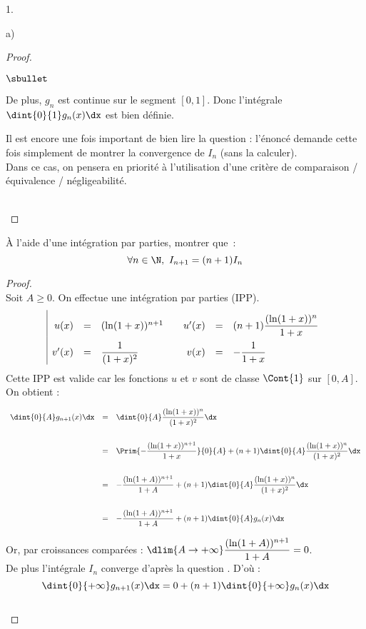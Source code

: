 \documentclass[11pt]{article}%
\begin{document}
\begin{noliste}{1.}
\begin{noliste}{a)}
\begin{proof}
\begin{noliste}{$\sbullet$}
  \item De plus, $g_n$ est continue sur le segment $[0,1]$. Donc 
  l'intégrale $\dint{0}{1} g_n(x) \dx$ est bien définie.
 \end{noliste}
 \begin{remark}
  Il est encore une fois important de bien lire la question : 
  l'énoncé demande cette fois simplement de montrer la 
  convergence de $I_n$ (sans la calculer).\\
  Dans ce cas, on pensera en priorité à l'utilisation 
  d'une critère de comparaison / équivalence / négligeabilité.
 \end{remark}~\\[-1.4cm]
\end{proof}


\item À l'aide d'une intégration par parties, montrer que~:
\[ 
\forall n \in \N, \ I_{n+1} = (n+1) I_n 
\]

\begin{proof}~\\
  Soit $A\geq 0$. On effectue une intégration par parties (IPP).
  \[
  \renewcommand{\arraystretch}{2.2}
  \begin{array}{|rcl@{\qquad}rcl}
   u(x) & = & (\ln(1+x))^{n+1} & u'(x) & = & (n+1) 
   \dfrac{(\ln(1+x))^n}{1+x} \\
   v'(x) & = & \dfrac{1}{(1+x)^2} & v(x) & = & -\dfrac{1}{1+x}
  \end{array}
  \]
Cette IPP est valide car les fonctions $u$ et $v$ sont de classe 
$\Cont{1}$ sur $[0,A]$. On obtient :
\[
 \begin{array}{rcl}
  \dint{0}{A} g_{n+1}(x) \dx & = & \dint{0}{A} \dfrac{(\ln(1+x))^n}
  {(1+x)^2} \dx 
  \\[.6cm]
  & = & \Prim{-\dfrac{(\ln(1+x))^{n+1}}{1+x}}{0}{A} + (n+1)
   \dint{0}{A}\dfrac{(\ln(1+x))^n}{(1+x)^2} \dx
   \\[.6cm]
   & = & -\dfrac{(\ln(1+A))^{n+1}}{1+A} + (n+1) \dint{0}{A} 
   \dfrac{(\ln(1+x))^n}{(1+x)^2} \dx
   \\[.6cm]
   & = & -\dfrac{(\ln(1+A))^{n+1}}{1+A} + (n+1) \dint{0}{A} 
   g_n(x) \dx
 \end{array}
\]


\newpage


Or, par croissances comparées : $\dlim{A\to+\infty} 
\dfrac{(\ln(1+A))^{n+1}}{1+A} = 0$.\\[.2cm]
De plus l'intégrale $I_n$ converge d'après la question . 
D'où :
\[
 \dint{0}{+\infty} g_{n+1}(x) \dx = 0+(n+1) \dint{0}{+\infty} 
 g_n(x) \dx
\]
~\\[-1.2cm]
\end{proof}


\end{noliste}
\end{noliste}
\end{document}
